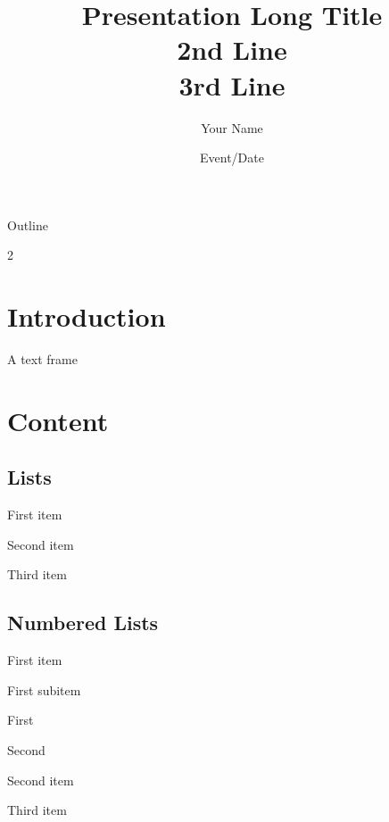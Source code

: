 \documentclass{beamer} %
\title[Presentation Short Title]{Presentation Long Title\\2nd Line\\3rd Line}
\author{Your Name}
\date{Event/Date}
\begin{document}
\begin{frame}
  \maketitle
\end{frame}


\begin{frame}{Outline}
    \begin{multicols}{2}
        \tableofcontents
    \end{multicols}
\end{frame}


\section{Introduction}

\begin{frame}{}
  A text frame
\end{frame}


\section{Content}

\subsection{Lists}

\begin{frame}{}
  \begin{tugitemize}
    \item First item
    \item Second item
    \item Third item
  \end{tugitemize}
\end{frame}


\subsection{Numbered Lists}

\begin{frame}{}
  \begin{tugenumerate}
    \item First item
      \begin{tugenumerate}
        \item First subitem
          \begin{tugenumerate}
            \item First 
            \item Second
          \end{tugenumerate}
      \end{tugenumerate}
      \pause
    \item Second item
      \pause
    \item Third item
  \end{tugenumerate}
\end{frame}
\end{document}
